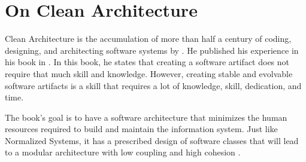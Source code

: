 \section{On Clean Architecture}

Clean Architecture is the accumulation of more than half a century of coding, designing,
and architecting software systems by \citeauthor*[]{martin_clean_2018}. He published his
experience in his book  in \citeyear[]{martin_clean_2018}.
In this book, he states that creating a software artifact does not require that much skill
and knowledge. However, creating stable and evolvable software artifacts is a skill that
requires a lot of knowledge, skill, dedication, and time.

The book's goal is to have a software architecture that minimizes the human resources
required to build and maintain the information system. Just like Normalized Systems, it
has a prescribed design of software classes that will lead to a modular architecture with
low coupling and high cohesion \parencite{martin_clean_2018}.

